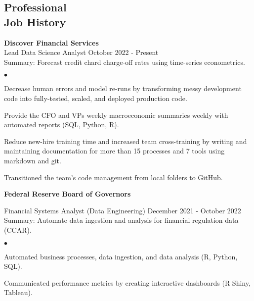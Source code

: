 \documentclass[margin, line]{res}
\newenvironment{list2}{
  \begin{list}{$\bullet$}{%
      \setlength{\itemsep}{0.04in}
      \setlength{\parsep}{0in} \setlength{\parskip}{0in}
      \setlength{\topsep}{0.05in} \setlength{\partopsep}{0in} 
      \setlength{\leftmargin}{\dimexpr 26pt-0.05in}}}
    {\end{list}}
\begin{document}
\begin{resume}
\vspace{-.35cm}


\section{\sc Professional \\ Job History }

{\bf Discover Financial Services}\\

\vspace{-.65cm}
Lead Data Science Analyst \hfill October 2022 - Present\\
\hspace*{3mm} 
    Summary: Forecast credit chard charge-off rates using time-series econometrics.
\hspace*{3mm}
    \begin{list2}
        \item Decrease human errors and model re-runs by transforming messy development code into fully-tested, scaled, and deployed production code.
        \item Provide the CFO and VPs weekly macroeconomic summaries weekly with automated reports (SQL, Python, R).
        \item Reduce new-hire training time and increased team cross-training by writing and maintaining documentation for more than 15 processes and 7 tools using markdown and git.
        \item Transitioned the team's code management from local folders to GitHub.
    \end{list2}

{\bf Federal Reserve Board of Governors}\\

\vspace{-.65cm}

Financial Systems Analyst (Data Engineering) \hfill December 2021 - October 2022\\
\hspace*{3mm} 
    Summary: Automate data ingestion and analysis for financial regulation data (CCAR).
\hspace*{3mm}
    \begin{list2}
        \item Automated business processes, data ingestion, and data analysis (R, Python, SQL).
        \item Communicated performance metrics by creating interactive dashboards (R Shiny, Tableau).
    \end{list2}



\end{resume}
\end{document}
